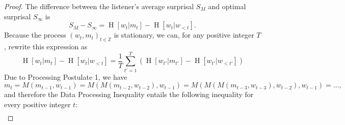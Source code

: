 \documentclass[11pt,letterpaper]{article}
\newcommand\mhahn[1]{{\color{red}(#1)}}
\newcounter{theorem}
\newtheorem{lemma}[theorem]{Lemma}
\begin{document}
\begin{proof}


The difference between the listener's average surprisal $S_M$ and optimal surprisal $S_\infty$ is 
	\begin{equation}
	\label{eq:surprisal-divergence}
		S_M - S_\infty = \operatorname{H}[w_t | m_t] - \operatorname{H}[w_t | w_{<t}].
	\end{equation}
	Because the process $(w_t, m_t)_{t\in\mathbb{Z}}$ is stationary, we can, for any positive integer $T$, rewrite this expression as
\begin{equation}\label{eq:byStation}
\operatorname{H}[w_t | m_t] - \operatorname{H}[w_t | w_{<t}] =  \frac{1}{T} \sum_{t'=1}^{T} \left(\operatorname{H}[w_{t'} | m_{t'}] - \operatorname{H}[w_{t'} | w_{<t'}]\right) 
\end{equation}
%
%
%
Due to Processing Postulate 1, we have %
\begin{equation}
	m_t = M(m_{t-1}, w_{t-1}) = M(M(m_{t-2}, w_{t-2}), w_{t-1}) = M(M(M(m_{t-3}, w_{t-3}), w_{t-2}), w_{t-1}) = \dots,
\end{equation}
and therefore the Data Processing Inequality \citep{cover2006elements} entails the following inequality for every positive integer $t$:
\begin{align}\label{eq:plugged}

\end{align}
\end{proof}
\end{document}

